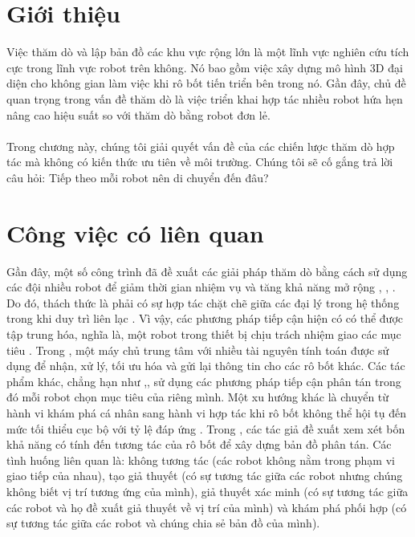 \documentclass[11pt,openany]{book}
\begin{document}
\section{Giới thiệu}
Việc thăm dò và lập bản đồ các khu vực rộng lớn là một lĩnh vực nghiên cứu tích cực trong lĩnh vực robot trên không. Nó bao gồm việc xây dựng mô hình 3D đại diện cho không gian làm việc khi rô bốt tiến triển bên trong nó. Gần đây, chủ đề quan trọng trong vấn đề thăm dò là việc triển khai hợp tác nhiều robot hứa hẹn nâng cao hiệu suất so với thăm dò bằng robot đơn lẻ.\\\\
Trong chương này, chúng tôi giải quyết vấn đề của các chiến lược thăm dò hợp tác mà không có kiến thức ưu tiên về môi trường. Chúng tôi sẽ cố gắng trả lời câu hỏi: Tiếp theo mỗi robot nên di chuyển đến đâu?
\section{Công việc có liên quan}
Gần đây, một số công trình đã đề xuất các giải pháp thăm dò bằng cách sử dụng các đội nhiều robot để giảm thời gian nhiệm vụ và tăng khả năng mở rộng \cite{bautin2012strategie}, \cite{jensen2013rolling}, \cite{yan2014team}. Do đó, thách thức là phải có sự hợp tác chặt chẽ giữa các đại lý trong hệ thống trong khi duy trì liên lạc \cite{rooker2007multi}. Vì vậy, các phương pháp tiếp cận hiện có có thể được tập trung hóa, nghĩa là, một robot trong thiết bị chịu trách nhiệm giao các mục tiêu \cite{burgard2000collaborative}. Trong \cite{schmuck2017multi}, một máy chủ trung tâm với nhiều tài nguyên tính toán được sử dụng để nhận, xử lý, tối ưu hóa và gửi lại thông tin cho các rô bốt khác. Các tác phẩm khác, chẳng hạn như \cite{yuan2010cooperative},\cite{sheng2006distributed}, sử dụng các phương pháp tiếp cận phân tán trong đó mỗi robot chọn mục tiêu của riêng mình. Một xu hướng khác là chuyển từ hành vi khám phá cá nhân sang hành vi hợp tác khi rô bốt không thể hội tụ đến mức tối thiểu cục bộ với tỷ lệ đáp ứng \cite{wu2012robust}. Trong \cite{konolige2003map}, các tác giả đề xuất xem xét bốn khả năng có tính đến tương tác của rô bốt để xây dựng bản đồ phân tán. Các tình huống liên quan là: không tương tác (các robot không nằm trong phạm vi giao tiếp của nhau), tạo giả thuyết (có sự tương tác giữa các robot nhưng chúng không biết vị trí tương ứng của mình), giả thuyết xác minh (có sự tương tác giữa các robot và họ đề xuất giả thuyết về vị trí của mình) và khám phá phối hợp (có sự tương tác giữa các robot và chúng chia sẻ bản đồ của mình).
\end{document}
